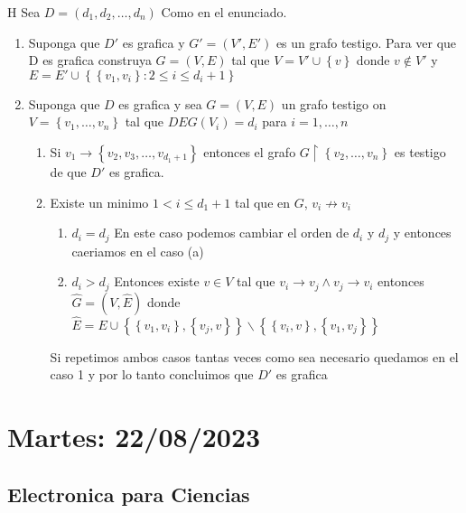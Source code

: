 \documentclass{report}
\begin{document}
\begin{myproof}{H}
  Sea $D=\left( d_1,d_2,\ldots,d_n \right) $ Como en el enunciado.
  \begin{enumerate}
    \item Suponga que $D'$ es grafica y $G'=\left( V',E' \right) $ es un grafo testigo. Para ver que D es grafica construya $G= \left( V,E \right) $ tal que $V=V'\cup \left\{ v \right\} $ donde $v \not\in V'$ y $E=E'\cup\left\{ \left\{ v_1,v_i \right\} : 2\le i\le d_i+1 \right\} $
    \item Suponga que $D$ es grafica y sea $G=\left( V,E \right) $ un grafo testigo on $V=\left\{ v_1,\ldots,v_n \right\} $ tal que $DEG\left( V_i \right) =d_i$ para $i = 1,\ldots,n$
      \begin{enumerate}
      	\item Si $v_1 \to \left\{ v_2,v_3,\ldots,v_{d_1+1} \right\} $ entonces el grafo $G\upharpoonright\left\{ v_2,\ldots,v_n \right\} $ es testigo de que $D'$ es grafica.
      	\item Existe un minimo $1<i\le d_1+1$ tal que en  $G$, $v_i \not\to v_i$
	   \begin{enumerate}
	    \item $d_i = d_j$ En este caso podemos cambiar el orden de $d_i$ y $d_j$ y entonces caeriamos en el caso (a)
	    \item $d_i > d_j$ Entonces existe  $v\in V$ tal que $v_i\to v_j \land v_j\to v_i$ entonces $\hat{G} = \left( V, \hat{E} \right) $ donde $\hat{E} = E \cup \left\{ \left\{ v_1,v_i \right\},\left\{ v_j,v \right\}   \right\} \backslash \left\{ \left\{ v_i,v \right\} ,\left\{ v_1,v_j \right\}  \right\} $
	  \end{enumerate}

	  Si repetimos ambos casos tantas veces como sea necesario quedamos en el caso 1 y por lo tanto concluimos que $D'$ es grafica
      \end{enumerate}
  \end{enumerate}

\end{myproof}


\chapter{Martes: 22/08/2023}
\section{Electronica para Ciencias}
\end{document}
